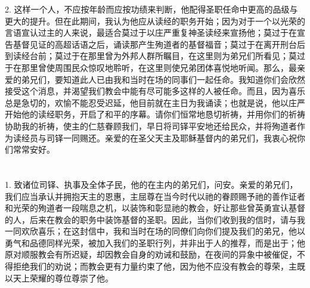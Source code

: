 2. 这样一个人，不应按年龄而应按功绩来判断，他配得圣职任命中更高的品级与更大的提升。但在此期间，我认为他应从读经的职务开始；因为对于一个以光荣的言语宣认过主的人来说，最适合莫过于以庄严重复神圣读经来宣扬他；莫过于在宣告基督见证的高超话语之后，诵读那产生殉道者的基督福音；莫过于在离开刑台后到读经台前；莫过于在那里曾为外邦人群所瞩目，在这里则为弟兄们所看见；莫过于在那里曾使周围民众惊叹地聆听，在这里则使兄弟团体喜悦地听闻。那么，最亲爱的弟兄们，要知道此人已由我和当时在场的同事们一起任命。我知道你们会欣然接受这个消息，并渴望我们教会中能有尽可能多这样的人被任命。而且，因为喜乐总是急切的，欢愉不能忍受迟延，他目前就在主日为我诵读；也就是说，他以庄严开始他的读经职务，开启了和平的序幕。请你们恒常地恳切祈祷，并用你们的祈祷协助我的祈祷，使主的仁慈眷顾我们，早日将司铎平安地还给民众，并将殉道者作为读经员与司铎一同赐还。亲爱的在圣父天主及耶稣基督内的弟兄们，我衷心祝你们常常安好。\par



\section{}

\par

\par

1. 致诸位司铎、执事及全体子民，他的在主内的弟兄们，问安。亲爱的弟兄们，我们应当承认并拥抱天主的恩惠，主屈尊在当今时代以祂的眷顾赐予祂的善作证者和光荣的殉道者一段喘息之机，以装饰和彰显祂的教会，好让那些曾英勇宣认基督的人，后来在教会的职务中装饰基督的圣职。因此，当你们收到我的信时，请与我一同欢欣喜乐；在这封信中，我和当时在场的同僚们向你们提及我们的弟兄，他以勇气和品德同样光荣，被加入我们的圣职行列，并非出于人的推荐，而是出于；他原对顺服教会有所迟疑，却因教会自身的劝诫和鼓励，在夜间的异象中被催促，不得拒绝我们的劝说；而教会更有力量约束了他，因为他不应没有教会的尊荣，主既以天上荣耀的尊位尊崇了他。\par

